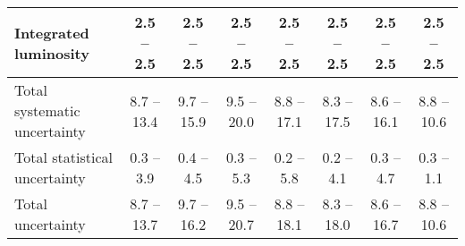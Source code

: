 \begin{landscape}
\begin{table}
{\begin{tabular}{lccccccc}
		Integrated luminosity	&	2.5 -- 2.5	&	2.5 -- 2.5	&	2.5 -- 2.5	&	2.5 -- 2.5	&	2.5 -- 2.5	&	2.5 -- 2.5	&	2.5 -- 2.5  \vspace*{0.1cm} \\ 
		\hline
		Total systematic uncertainty	&	8.7 -- 13.4	&	9.7 -- 15.9	&	9.5 -- 20.0	&	8.8 -- 17.1	&	8.3 -- 17.5	&	8.6 -- 16.1	&	8.8 -- 10.6\\ 
		Total statistical uncertainty	&	0.3 -- 3.9	&	0.4 -- 4.5	&	0.3 -- 5.3	&	0.2 -- 5.8	&	0.2 -- 4.1	&	0.3 -- 4.7	&	0.3 -- 1.1  \vspace*{0.1cm} \\ 
		\hline
		Total uncertainty	&	8.7 -- 13.7	&	9.7 -- 16.2	&	9.5 -- 20.7	&	8.8 -- 18.1	&	8.3 -- 18.0	&	8.6 -- 16.7	&	8.8 -- 10.6\\ 
	\end{tabular}%
	}
\end{table}
\end{landscape}
\clearpage
